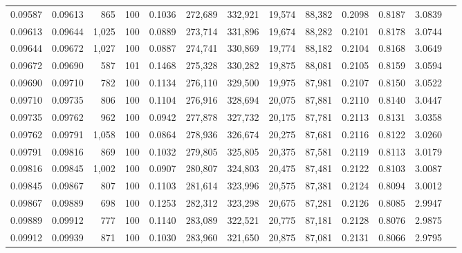 \begin{tabular}{rrrrrrrrrrrrr}
0.09587 & 0.09613 &   865 & 100 &                                     0.1036 & 272,689 & 332,921 &  19,574 &  88,382 & 0.2098 & 0.8187 & 3.0839 \\
0.09613 & 0.09644 & 1,025 & 100 &                                     0.0889 & 273,714 & 331,896 &  19,674 &  88,282 & 0.2101 & 0.8178 & 3.0744 \\
0.09644 & 0.09672 & 1,027 & 100 &                                     0.0887 & 274,741 & 330,869 &  19,774 &  88,182 & 0.2104 & 0.8168 & 3.0649 \\
0.09672 & 0.09690 &   587 & 101 &                                     0.1468 & 275,328 & 330,282 &  19,875 &  88,081 & 0.2105 & 0.8159 & 3.0594 \\
0.09690 & 0.09710 &   782 & 100 &                                     0.1134 & 276,110 & 329,500 &  19,975 &  87,981 & 0.2107 & 0.8150 & 3.0522 \\
0.09710 & 0.09735 &   806 & 100 &                                     0.1104 & 276,916 & 328,694 &  20,075 &  87,881 & 0.2110 & 0.8140 & 3.0447 \\
0.09735 & 0.09762 &   962 & 100 &                                     0.0942 & 277,878 & 327,732 &  20,175 &  87,781 & 0.2113 & 0.8131 & 3.0358 \\
0.09762 & 0.09791 & 1,058 & 100 &                                     0.0864 & 278,936 & 326,674 &  20,275 &  87,681 & 0.2116 & 0.8122 & 3.0260 \\
0.09791 & 0.09816 &   869 & 100 &                                     0.1032 & 279,805 & 325,805 &  20,375 &  87,581 & 0.2119 & 0.8113 & 3.0179 \\
0.09816 & 0.09845 & 1,002 & 100 &                                     0.0907 & 280,807 & 324,803 &  20,475 &  87,481 & 0.2122 & 0.8103 & 3.0087 \\
0.09845 & 0.09867 &   807 & 100 &                                     0.1103 & 281,614 & 323,996 &  20,575 &  87,381 & 0.2124 & 0.8094 & 3.0012 \\
0.09867 & 0.09889 &   698 & 100 &                                     0.1253 & 282,312 & 323,298 &  20,675 &  87,281 & 0.2126 & 0.8085 & 2.9947 \\
0.09889 & 0.09912 &   777 & 100 &                                     0.1140 & 283,089 & 322,521 &  20,775 &  87,181 & 0.2128 & 0.8076 & 2.9875 \\
0.09912 & 0.09939 &   871 & 100 &                                     0.1030 & 283,960 & 321,650 &  20,875 &  87,081 & 0.2131 & 0.8066 & 2.9795 \\

\end{tabular}
